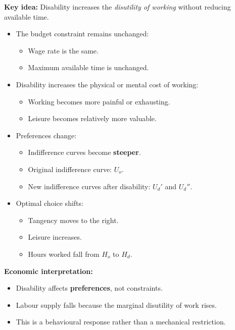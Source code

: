 \documentclass[12pt]{article}
\begin{document}
\textbf{Key idea:} Disability increases the \emph{disutility of working} without reducing available time.

\begin{itemize}
\item The budget constraint remains unchanged:
  \begin{itemize}
  \item Wage rate is the same.
  \item Maximum available time is unchanged.
  \end{itemize}

\item Disability increases the physical or mental cost of working:
  \begin{itemize}
  \item Working becomes more painful or exhausting.
  \item Leisure becomes relatively more valuable.
  \end{itemize}

\item Preferences change:
  \begin{itemize}
  \item Indifference curves become \textbf{steeper}.
  \item Original indifference curve: $U_o$.
  \item New indifference curves after disability: $U_d'$ and $U_d''$.
  \end{itemize}

\item Optimal choice shifts:
  \begin{itemize}
  \item Tangency moves to the right.
  \item Leisure increases.
  \item Hours worked fall from $H_o$ to $H_d$.
  \end{itemize}
\end{itemize}

\textbf{Economic interpretation:}
\begin{itemize}
\item Disability affects \textbf{preferences}, not constraints.
\item Labour supply falls because the marginal disutility of work rises.
\item This is a behavioural response rather than a mechanical restriction.
\end{itemize}

\vspace{0.5em}
\end{document}
